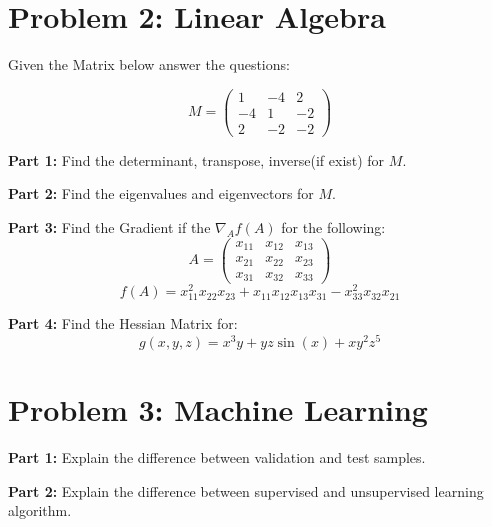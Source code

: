 \documentclass[12pt,letterpaper]{article}
\begin{document}
\section*{Problem 2: Linear Algebra}

Given the Matrix below answer the questions:

\begin{equation*}
   M = \begin{pmatrix} 
1 & -4 & 2 \\
-4 & 1 & -2 \\
2 & -2 & -2 
\end{pmatrix}
\end{equation*}


    \item \textbf{Part 1:} Find the determinant, transpose, inverse(if exist) for $M$.

    \item \textbf{Part 2:} Find the eigenvalues and eigenvectors for $M$. 
      
    \item \textbf{Part 3:} Find the Gradient if the $\nabla_A f(A)$ for the following:
   \begin{equation*}
	A=\begin{pmatrix} 
	x_{11} & x_{12} & x_{13} \\
	x_{21} & x_{22} & x_{23} \\
	x_{31} & x_{32} & x_{33} 
	\end{pmatrix}
  \end{equation*}
  \begin{equation*}
   f(A)= x_{11}^2 x_{22} x_{23} + x_{11}x_{12}x_{13}x_{31}-x_{33}^2 x_{32} x_{21}
   \end{equation*}

	\item \textbf{Part 4:} Find the Hessian Matrix for:
   \begin{equation*}
	g(x,y,z)=x^3y+yz\sin(x)+xy^2z^5
  \end{equation*}
   	
\section*{Problem 3: Machine Learning}
 \item \textbf{Part 1:} Explain the difference between validation and test samples. 

 \item \textbf{Part 2:} Explain the difference between supervised and unsupervised learning algorithm. 
\end{document}
